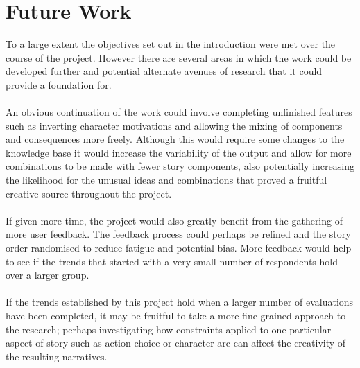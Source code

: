 \documentclass[letterpaper]{article}
\begin{document}
\section{Future Work}
To a large extent the objectives set out in the introduction were met over the course of the project. However there are several areas in which the work could be developed further and potential alternate avenues of research that it could provide a foundation for.\\
\\An obvious continuation of the work could involve completing unfinished features such as inverting character motivations and allowing the mixing of components and consequences more freely. Although this would require some changes to the knowledge base it would increase the variability of the output and allow for more combinations to be made with fewer story components, also potentially increasing the likelihood for the unusual ideas and combinations that proved a fruitful creative source throughout the project.\\
\\If given more time, the project would also greatly benefit from the gathering of more user feedback. The feedback process could perhaps be refined and the story order randomised to reduce fatigue and potential bias. More feedback would help to see if the trends that started with a very small number of respondents hold over a larger group.\\
\\If the trends established by this project hold when a larger number of evaluations have been completed, it may be fruitful to take a more fine grained approach to the research; perhaps investigating how constraints applied to one particular aspect of story such as action choice or character arc can affect the creativity of the resulting narratives.\\

\end{document}
